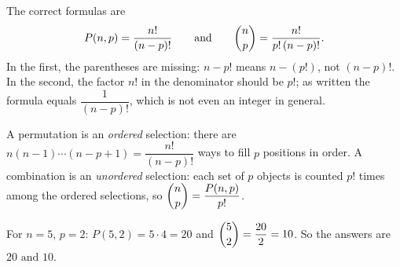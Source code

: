 The correct formulas are
\[
P(n,p)=\dfrac{n!}{(n-p)!}\qquad\text{and}\qquad\dbinom np=\dfrac{n!}{p!\,(n-p)!}.
\]
In the first, the parentheses are missing: $n-p!$ means $n-(p!)$, not $(n-p)!$. In the second, the factor $n!$ in the denominator should be $p!$; as written the formula equals $\dfrac{1}{(n-p)!}$, which is not even an integer in general.

A permutation is an \emph{ordered} selection: there are $n(n-1)\cdots(n-p+1)=\dfrac{n!}{(n-p)!}$ ways to fill $p$ positions in order. A combination is an \emph{unordered} selection: each set of $p$ objects is counted $p!$ times among the ordered selections, so $\dbinom np=\dfrac{P(n,p)}{p!}$.

For $n=5$, $p=2$: $P(5,2)=5\cdot4=20$ and $\dbinom52=\dfrac{20}{2}=10$. So the answers are $\boxed{20\text{ and }10}$.
